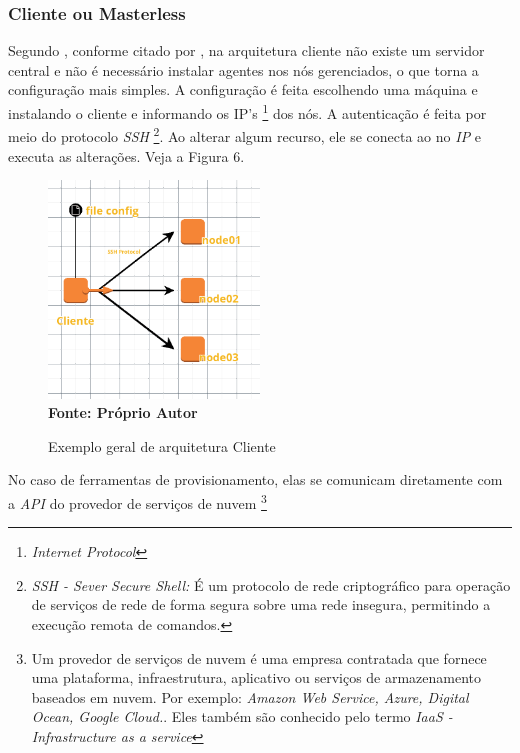 \subsubsection{Cliente ou Masterless} \label{semagent}
Segundo , conforme citado por , na arquitetura cliente não existe um servidor central e não é necessário instalar agentes nos nós gerenciados, o que torna a configuração mais simples. A configuração é feita escolhendo uma máquina e instalando o cliente e informando os IP's \footnote{\textit{Internet Protocol}} dos nós. A autenticação é feita por meio do protocolo \textit{SSH} \footnote{\textit{SSH - Sever Secure Shell:}  É um protocolo de rede criptográfico para operação de serviços de rede de forma segura sobre uma rede insegura, permitindo a execução remota de comandos.}. Ao alterar algum recurso, ele se conecta ao no \textit{IP} e executa as alterações.  Veja a Figura 6. 

\begin{figure}[H]
	\centering	
	\caption[\hspace{0.1cm}Exemplo arquitetura Cliente]{Exemplo geral de arquitetura Cliente}
	\vspace{-0.4cm}
	\includegraphics[width=0.5\textwidth]{figuras/cliente.png}
	 \vspace{-0.2cm}
	\\\textbf{\footnotesize Fonte: Próprio Autor}
	\label{fig:figura6}
\end{figure}
\vspace{-0.5cm}


No caso de ferramentas de provisionamento, elas se comunicam diretamente com a \textit{API} do provedor de serviços de nuvem \footnote{Um provedor de serviços de nuvem é uma empresa contratada que fornece uma plataforma, infraestrutura, aplicativo ou serviços de armazenamento baseados em nuvem. Por exemplo: \textit{Amazon Web Service, Azure, Digital Ocean, Google Cloud.}. Eles também são conhecido pelo termo \textit{IaaS - Infrastructure as a service} }


